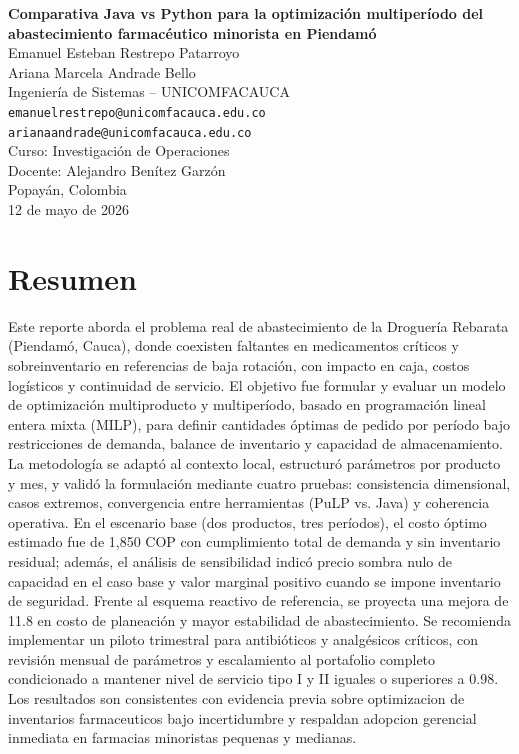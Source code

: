 \documentclass[12pt,letterpaper]{article}
\begin{document}
\begin{titlepage}
	\centering
	\vspace*{1.8cm}
	{\Large \textbf{Comparativa Java vs Python para la optimización multiperíodo del abastecimiento farmacéutico minorista en Piendamó}}\\[1.4cm]


	Emanuel Esteban Restrepo Patarroyo\\
	Ariana Marcela Andrade Bello\\
	Ingeniería de Sistemas -- UNICOMFACAUCA\\
\texttt{emanuelrestrepo@unicomfacauca.edu.co}\\
\texttt{arianaandrade@unicomfacauca.edu.co}\\[0.8cm]

	Curso: Investigación de Operaciones\\
	Docente: Alejandro Benítez Garzón\\[0.8cm]

	\vfill
	{\large Popayán, Colombia}\\
	{\large 12 de mayo de 2026}
\end{titlepage}

\tableofcontents
\listoftables
\newpage

\section*{Resumen}
Este reporte aborda el problema real de abastecimiento de la Droguería Rebarata (Piendamó,
Cauca), donde coexisten faltantes en medicamentos críticos y sobreinventario en referencias de baja
rotación, con impacto en caja, costos logísticos y continuidad de servicio. El objetivo fue formular y
evaluar un modelo de optimización multiproducto y multiperíodo, basado en programación lineal
entera mixta (MILP), para definir cantidades óptimas de pedido por período bajo restricciones
de demanda, balance de inventario y capacidad de almacenamiento. La metodología  se adaptó al contexto local, estructuró parámetros por producto y
mes, y validó la formulación mediante cuatro pruebas: consistencia dimensional, casos extremos,
convergencia entre herramientas (PuLP vs. Java) y coherencia operativa.
En el escenario base (dos productos, tres períodos), el costo óptimo estimado fue de 1,850 COP
con cumplimiento total de demanda y sin inventario residual; además, el análisis de sensibilidad
indicó precio sombra nulo de capacidad en el caso base y valor marginal positivo cuando se impone
inventario de seguridad. Frente al esquema reactivo de referencia, se proyecta una mejora de 11.8%
en costo de planeación y mayor estabilidad de abastecimiento. Se recomienda implementar un
piloto trimestral para antibióticos y analgésicos críticos, con revisión mensual de parámetros y
escalamiento al portafolio completo condicionado a mantener nivel de servicio tipo I y II iguales
o superiores a 0.98. Los resultados son consistentes con evidencia previa sobre optimizacion de
inventarios farmaceuticos bajo incertidumbre y respaldan adopcion gerencial inmediata en farmacias
minoristas pequenas y medianas.
\end{document}
